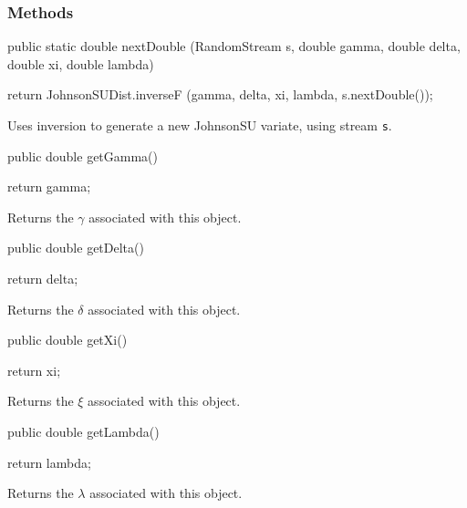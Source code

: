 \subsubsection* {Methods}
\begin{code}
   
   public static double nextDouble (RandomStream s, double gamma,
                                    double delta, double xi, double lambda) \begin{hide} {
      return JohnsonSUDist.inverseF (gamma, delta, xi, lambda,
                                        s.nextDouble());
   }\end{hide}
\end{code}
 \begin{tabb}  Uses inversion to generate a new JohnsonSU variate,
   using stream \texttt{s}.
 \end{tabb}
\begin{code}

   public double getGamma()\begin{hide} {
      return gamma;
   }
\end{hide}
\end{code}
\begin{tabb}
   Returns the $\gamma$ associated with this object.
\end{tabb}
\begin{code}

   public double getDelta()\begin{hide} {
      return delta;
   }
\end{hide}
\end{code}
\begin{tabb}
   Returns the $\delta$ associated with this object.
\end{tabb}
\begin{code}

   public double getXi()\begin{hide} {
      return xi;
   }
\end{hide}
\end{code}
\begin{tabb}
   Returns the $\xi$ associated with this object.
\end{tabb}
\begin{code}

   public double getLambda()\begin{hide} {
      return lambda;
   }
\end{hide}
\end{code}
\begin{tabb}
   Returns the $\lambda$ associated with this object.
\end{tabb}
